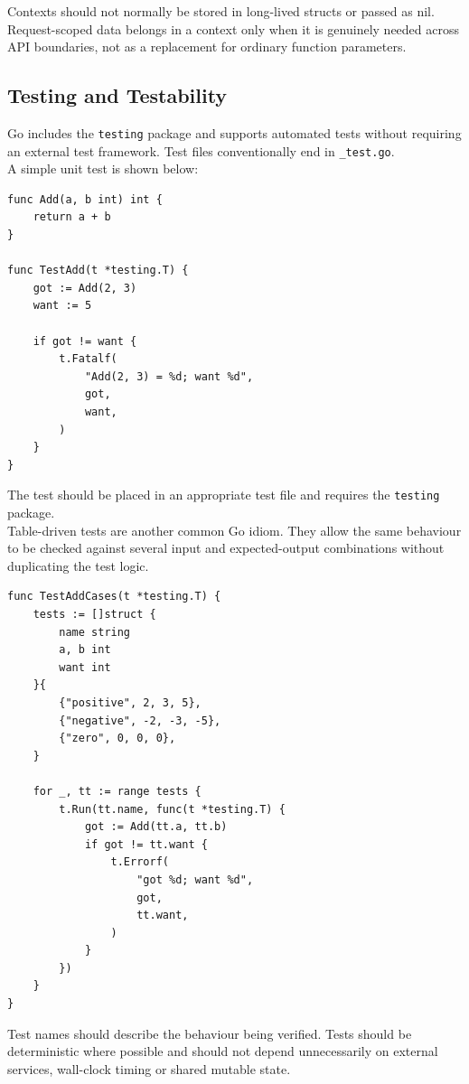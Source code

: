 Contexts should not normally be stored in long-lived structs or passed as nil. Request-scoped data belongs in a context only when it is genuinely needed across API boundaries, not as a replacement for ordinary function parameters.

\subsection{Testing and Testability}

Go includes the \texttt{testing} package and supports automated tests without requiring an external test framework. Test files conventionally end in \texttt{\_test.go}.\\

A simple unit test is shown below:

\begin{lstlisting}
func Add(a, b int) int {
    return a + b
}

func TestAdd(t *testing.T) {
    got := Add(2, 3)
    want := 5

    if got != want {
        t.Fatalf(
            "Add(2, 3) = %d; want %d",
            got,
            want,
        )
    }
}
\end{lstlisting}

The test should be placed in an appropriate test file and requires the \texttt{testing} package.\\

Table-driven tests are another common Go idiom. They allow the same behaviour to be checked against several input and expected-output combinations without duplicating the test logic.

\begin{lstlisting}
func TestAddCases(t *testing.T) {
    tests := []struct {
        name string
        a, b int
        want int
    }{
        {"positive", 2, 3, 5},
        {"negative", -2, -3, -5},
        {"zero", 0, 0, 0},
    }

    for _, tt := range tests {
        t.Run(tt.name, func(t *testing.T) {
            got := Add(tt.a, tt.b)
            if got != tt.want {
                t.Errorf(
                    "got %d; want %d",
                    got,
                    tt.want,
                )
            }
        })
    }
}
\end{lstlisting}

Test names should describe the behaviour being verified. Tests should be deterministic where possible and should not depend unnecessarily on external services, wall-clock timing or shared mutable state.\\

